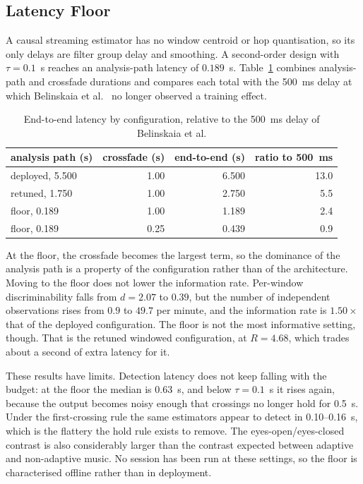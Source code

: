 \documentclass[11pt,a4paper]{article}
\begin{document}
\subsection{Latency Floor}

A causal streaming estimator has no window centroid or hop quantisation, so its only
delays are filter group delay and smoothing. A second-order design with $\tau = 0.1$~s
reaches an analysis-path latency of $0.189$~s. Table~\ref{tab:floor} combines
analysis-path and crossfade durations and compares each total with the 500~ms delay at
which Belinskaia et al.~\cite{belinskaia} no longer observed a training effect.

\begin{table}[h]
\centering
\caption{End-to-end latency by configuration, relative to the 500~ms delay of Belinskaia
et al.}
\label{tab:floor}
\begin{tabular}{lrrr}
\toprule
analysis path (s) & crossfade (s) & end-to-end (s) & ratio to 500~ms \\
\midrule
deployed, 5.500 & 1.00 & 6.500 & 13.0 \\
retuned, 1.750 & 1.00 & 2.750 & 5.5 \\
floor, 0.189 & 1.00 & 1.189 & 2.4 \\
floor, 0.189 & 0.25 & 0.439 & 0.9 \\
\bottomrule
\end{tabular}
\end{table}

At the floor, the crossfade becomes the largest term, so the dominance of the analysis
path is a property of the configuration rather than of the architecture. Moving to the
floor does not lower the information rate. Per-window discriminability falls from
$d = 2.07$ to $0.39$, but the number of independent observations rises from $0.9$ to
$49.7$ per minute, and the information rate is $1.50\times$ that of the deployed
configuration. The floor is not the most informative setting, though. That is the retuned
windowed configuration, at $R = 4.68$, which trades about a second of extra latency for
it.

These results have limits. Detection latency does not keep falling with the budget: at the
floor the median is $0.63$~s, and below $\tau = 0.1$~s it rises again, because the output
becomes noisy enough that crossings no longer hold for 0.5~s. Under the first-crossing rule
the same estimators appear to detect in 0.10--0.16~s, which is the flattery the hold rule
exists to remove. The eyes-open/eyes-closed contrast is also considerably larger than the
contrast expected between adaptive and non-adaptive music. No session has been run at
these settings, so the floor is characterised offline rather than in deployment.
\end{document}
